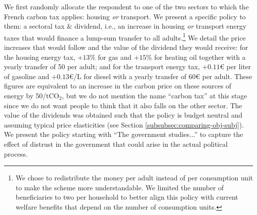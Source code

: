 \documentclass[12pt]{article} %
\begin{document}

We first randomly allocate the respondent to one of the two sectors to which the French carbon tax applies: housing \textit{or} transport. We present a specific policy to them: a sectoral tax \& dividend, i.e., an increase in housing \textit{or} transport energy taxes that would finance a lump-sum transfer to all adults.\footnote{We chose to redistribute the money per adult instead of per consumption unit to make the scheme more understandable. We limited the number of beneficiaries to two per household to better align this policy with current welfare benefits that depend on the number of consumption units.} We detail the price increases that would follow and the value of the dividend they would receive: for the housing energy tax, $+13\%$ for gas and $+15\%$ for heating oil together with a yearly transfer of 50\euros{} per adult; and for the transport energy tax, $+0.11$\euro{} per liter of gasoline and $+0.13$\euro{}/L for diesel with a yearly transfer of 60\euro{} per adult. These figures are equivalent to an increase in the carbon price on these sources of energy by 50\euros{}/t$\text{CO}_{2}$, but we do not mention the name ``carbon tax'' at this stage since we do not want people to think that it also falls on the other sector. The value of the dividends was obtained such that the policy is budget neutral and assuming typical price elasticities (see Section \ref{subsubsec:comparing-obj-subj}). We present the policy starting with ``The government studies...'' to capture the effect of distrust in the government that could arise in the actual political process.
\end{document}
